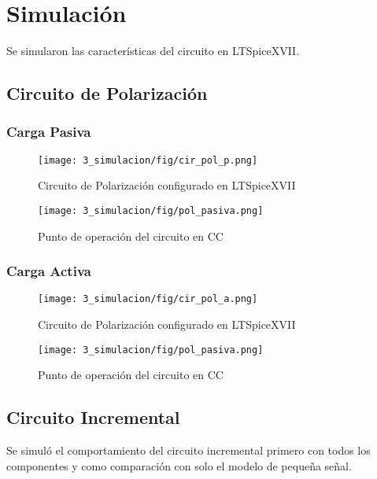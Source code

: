 \chapter{Simulación}

Se simularon las características del circuito en LTSpiceXVII.

\section{Circuito de Polarización}

\subsection{Carga Pasiva}
\begin{figure}[ht]
    \begin{minipage}[t]{0.43\textwidth}
        \centering
        \texttt{[image: 3\_simulacion/fig/cir\_pol\_p.png]}
        \caption{Circuito de Polarización configurado en LTSpiceXVII}
    \end{minipage}\hfill
    \begin{minipage}[t]{0.43\textwidth}
        \centering
        \texttt{[image: 3\_simulacion/fig/pol\_pasiva.png]}
        \caption{Punto de operación del circuito en CC}
    \end{minipage}
\end{figure}

\subsection{Carga Activa}
\begin{figure}[ht]
    \begin{minipage}[t]{0.43\textwidth}
        \centering
        \texttt{[image: 3\_simulacion/fig/cir\_pol\_a.png]}
        \caption{Circuito de Polarización configurado en LTSpiceXVII}
    \end{minipage}\hfill
    \begin{minipage}[t]{0.43\textwidth}
        \centering
        \texttt{[image: 3\_simulacion/fig/pol\_pasiva.png]}
        \caption{Punto de operación del circuito en CC}
    \end{minipage}
\end{figure}

\newpage
\section{Circuito Incremental}
Se simuló el comportamiento del circuito incremental primero con todos los componentes y como comparación con solo el modelo de pequeña señal.

